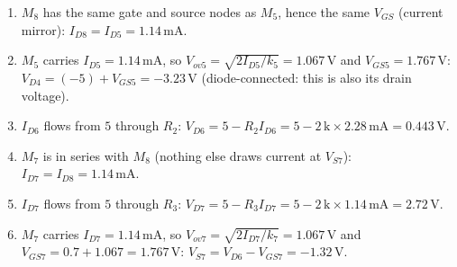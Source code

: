 \documentclass[11pt]{article}
\begin{document}
\begin{enumerate}[leftmargin=*,itemsep=3pt]
\item $M_{8}$ has the same gate and source nodes as $M_{5}$, hence the same $V_{GS}$ (current mirror): $I_{D8} = I_{D5} = 1.14\,\mathrm{m}\mathrm{A}$.
\item $M_{5}$ carries $I_{D5} = 1.14\,\mathrm{m}\mathrm{A}$, so $V_{ov5} = \sqrt{2I_{D5}/k_{5}} = 1.067$\,V and $V_{GS5} = 1.767$\,V: $V_{D4} = (-5) + V_{GS5} = -3.23\,\mathrm{V}$ (diode-connected: this is also its drain voltage).
\item $I_{D6}$ flows from $5$ through $R_{2}$: $V_{D6} = 5 - R_{2}I_{D6} = 5 - 2\,\mathrm{k}\times2.28\,\mathrm{m}\mathrm{A} = 0.443\,\mathrm{V}$.
\item $M_{7}$ is in series with $M_{8}$ (nothing else draws current at $V_{S7}$): $I_{D7} = I_{D8} = 1.14\,\mathrm{m}\mathrm{A}$.
\item $I_{D7}$ flows from $5$ through $R_{3}$: $V_{D7} = 5 - R_{3}I_{D7} = 5 - 2\,\mathrm{k}\times1.14\,\mathrm{m}\mathrm{A} = 2.72\,\mathrm{V}$.
\item $M_{7}$ carries $I_{D7} = 1.14\,\mathrm{m}\mathrm{A}$, so $V_{ov7} = \sqrt{2I_{D7}/k_{7}} = 1.067$\,V and $V_{GS7} = 0.7 + 1.067 = 1.767$\,V: $V_{S7} = V_{D6} - V_{GS7} = -1.32\,\mathrm{V}$.
\end{enumerate}
\end{document}
